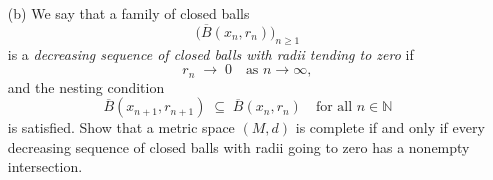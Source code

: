 \documentclass[12pt]{amsart}
\theoremstyle{definition}
\theoremstyle{remark}
\begin{document}
\begin{CJK}{UTF8}{bkai}
\begin{enumerate}
\begin{enumerate}
  \item[(b)]  We say that a family of closed balls 
\[
\bigl(\overline{B}(x_n,r_n)\bigr)_{n\ge 1}
\]
is a \emph{decreasing sequence of closed balls with radii tending to zero} if 
\[
r_n \;\to\; 0 \quad\text{as } n\to\infty,
\]
and the nesting condition
\[
\overline{B}(x_{n+1},r_{n+1}) \;\subseteq\; \overline{B}(x_n,r_n)
\quad\text{for all } n\in\mathbb{N}
\]
is satisfied.
  Show that a metric space $(M,d)$ is complete if and only if every decreasing sequence of closed balls with radii going to zero has a nonempty intersection. \end{enumerate}

\vfill





\end{enumerate}



\end{CJK}
\end{document}
